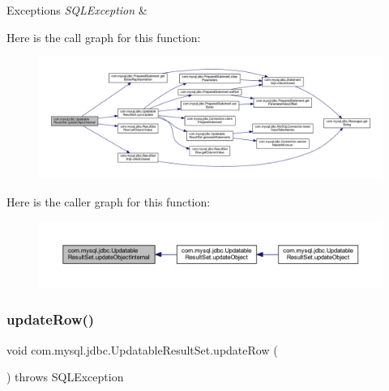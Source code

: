 \begin{DoxyExceptions}{Exceptions}
{\em S\+Q\+L\+Exception} & \\
\hline
\end{DoxyExceptions}
Here is the call graph for this function\+:
\nopagebreak
\begin{figure}[H]
\begin{center}
\leavevmode
\includegraphics[width=350pt]{classcom_1_1mysql_1_1jdbc_1_1_updatable_result_set_ad401023491c0c0dcb52ae3e4f731e9f7_cgraph}
\end{center}
\end{figure}
Here is the caller graph for this function\+:
\nopagebreak
\begin{figure}[H]
\begin{center}
\leavevmode
\includegraphics[width=350pt]{classcom_1_1mysql_1_1jdbc_1_1_updatable_result_set_ad401023491c0c0dcb52ae3e4f731e9f7_icgraph}
\end{center}
\end{figure}
\mbox{\label{classcom_1_1mysql_1_1jdbc_1_1_updatable_result_set_a919969ba4b3c7cbc7b18605e9f31a746}} 
\subsubsection{\texorpdfstring{update\+Row()}{updateRow()}}
{\footnotesize\ttfamily void com.\+mysql.\+jdbc.\+Updatable\+Result\+Set.\+update\+Row (\begin{DoxyParamCaption}{ }\end{DoxyParamCaption}) throws S\+Q\+L\+Exception}

